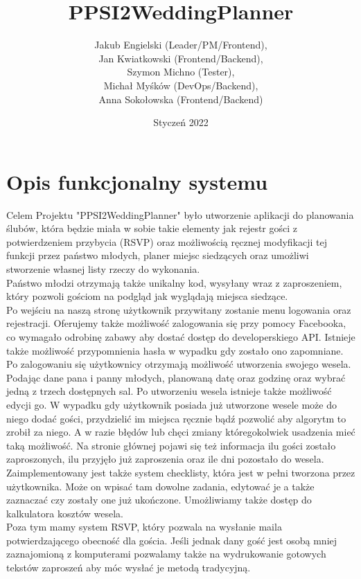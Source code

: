 \documentclass{article}
\title{PPSI2\textunderscore Wedding\textunderscore Planner}
\author{
Jakub Engielski (Leader/PM/Frontend),\\
Jan Kwiatkowski (Frontend/Backend), \\
Szymon Michno (Tester), \\
Michał Myśków (DevOps/Backend), \\
Anna Sokołowska (Frontend/Backend)
}
\date{Styczeń 2022}
\begin{document}
\maketitle

\section{Opis funkcjonalny systemu}
Celem Projektu "PPSI2\textunderscore Wedding\textunderscore Planner" było utworzenie aplikacji do planowania ślubów, która będzie miała w sobie takie elementy jak rejestr gości z potwierdzeniem przybycia (RSVP) oraz możliwością ręcznej modyfikacji tej funkcji przez państwo młodych, planer miejsc siedzących oraz umożliwi stworzenie własnej listy rzeczy do wykonania.
\\Państwo młodzi otrzymają także unikalny kod, wysyłany wraz z zaproszeniem, który pozwoli gościom na podgląd jak wyglądają miejsca siedzące.
\\Po wejściu na naszą stronę użytkownik przywitany zostanie menu logowania oraz rejestracji. Oferujemy także możliwość zalogowania się przy pomocy Facebooka, co wymagało odrobinę zabawy aby dostać dostęp do developerskiego API. Istnieje także możliwość przypomnienia hasła w wypadku gdy zostało ono zapomniane.
\\Po zalogowaniu się użytkownicy otrzymają możliwość utworzenia swojego wesela. Podając dane pana i panny młodych, planowaną datę oraz godzinę oraz wybrać jedną z trzech dostępnych sal. Po utworzeniu wesela istnieje także możliwość edycji go. W wypadku gdy użytkownik posiada już utworzone wesele może do niego dodać gości, przydzielić im miejsca ręcznie bądź pozwolić aby algorytm to zrobił za niego. A w razie błędów lub chęci zmiany któregokolwiek usadzenia mieć taką możliwość. Na stronie głównej pojawi się też informacja ilu gości zostało zaproszonych, ilu przyjęło już zaproszenia oraz ile dni pozostało do wesela. 
\\
Zaimplementowany jest także system checklisty, która jest w pełni tworzona przez użytkownika. Może on wpisać tam dowolne zadania, edytować je a także zaznaczać czy zostały one już ukończone. Umożliwiamy także dostęp do kalkulatora kosztów wesela.
\\
Poza tym mamy system RSVP, który pozwala na wysłanie maila potwierdzającego obecność dla gościa. Jeśli jednak dany gość jest osobą mniej zaznajomioną z komputerami pozwalamy także na wydrukowanie gotowych tekstów zaproszeń aby móc wysłać je metodą tradycyjną.
\end{document}
